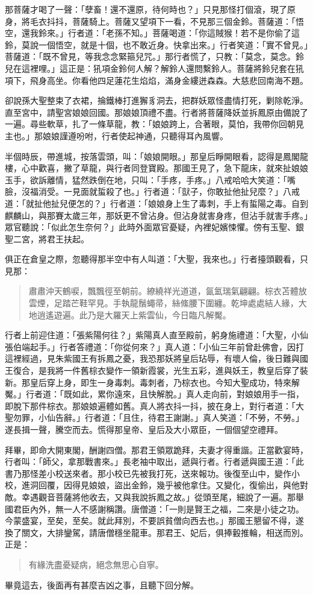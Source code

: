 那菩薩才喝了一聲：「孽畜！還不還原，待何時也？」只見那怪打個滾，現了原身，將毛衣抖抖，菩薩騎上。菩薩又望項下一看，不見那三個金鈴。菩薩道：「悟空，還我鈴來。」行者道：「老孫不知。」菩薩喝道：「你這賊猴！若不是你偷了這鈴，莫說一個悟空，就是十個，也不敢近身。快拿出來。」行者笑道：「實不曾見。」菩薩道：「既不曾見，等我念念緊箍兒咒。」那行者慌了，只教：「莫念，莫念。鈴兒在這裡哩。」這正是：犼項金鈴何人解？解鈴人還問繫鈴人。菩薩將鈴兒套在犼項下，飛身高坐。你看他四足蓮花生焰焰，滿身金縷迸森森。大慈悲回南海不題。

卻說孫大聖整束了衣裙，掄鐵棒打進獬豸洞去，把群妖眾怪盡情打死，剿除乾淨。直至宮中，請聖宮娘娘回國。那娘娘頂禮不盡。行者將菩薩降妖並拆鳳原由備說了一遍。尋些軟草，扎了一條草龍，教：「娘娘跨上，合著眼，莫怕，我帶你回朝見主也。」那娘娘謹遵吩咐，行者使起神通，只聽得耳內風響。

半個時辰，帶進城，按落雲頭，叫：「娘娘開眼。」那皇后睜開眼看，認得是鳳閣龍樓，心中歡喜，撇了草龍，與行者同登寶殿。那國王見了，急下龍床，就來扯娘娘玉手，欲訴離情，猛然跌倒在地，只叫：「手疼，手疼。」八戒哈哈大笑道：「嘴臉，沒福消受。一見面就蜇殺了也。」行者道：「獃子，你敢扯他扯兒麼？」八戒道：「就扯他扯兒便怎的？」行者道：「娘娘身上生了毒刺，手上有蜇陽之毒。自到麒麟山，與那賽太歲三年，那妖更不曾沾身。但沾身就害身疼，但沾手就害手疼。」眾官聽說：「似此怎生奈何？」此時外面眾官憂疑，內裡妃嬪悚懼。傍有玉聖、銀聖二宮，將君王扶起。

俱正在倉皇之際，忽聽得那半空中有人叫道：「大聖，我來也。」行者擡頭觀看，只見那：
\begin{quote}
肅肅沖天鶴唳，飄飄徑至朝前。繚繞祥光道道，氤氳瑞氣翩翩。棕衣苫體放雲煙，足踏芒鞋罕見。手執龍鬚蠅帚，絲絛腰下圍纏。乾坤處處結人緣，大地逍遙遊遍。此乃是大羅天上紫雲仙，今日臨凡解魘。
\end{quote}

行者上前迎住道：「張紫陽何往？」紫陽真人直至殿前，躬身施禮道：「大聖，小仙張伯端起手。」行者答禮道：「你從何來？」真人道：「小仙三年前曾赴佛會，因打這裡經過，見朱紫國王有拆鳳之憂，我恐那妖將皇后玷辱，有壞人倫，後日難與國王復合，是我將一件舊棕衣變作一領新霞裳，光生五彩，進與妖王，教皇后穿了裝新。那皇后穿上身，即生一身毒刺。毒刺者，乃棕衣也。今知大聖成功，特來解魘。」行者道：「既如此，累你遠來，且快解脫。」真人走向前，對娘娘用手一指，即脫下那件棕衣。那娘娘遍體如舊。真人將衣抖一抖，披在身上，對行者道：「大聖勿罪，小仙告辭。」行者道：「且住，待君王謝謝。」真人笑道：「不勞，不勞。」遂長揖一聲，騰空而去。慌得那皇帝、皇后及大小眾臣，一個個望空禮拜。

拜畢，即命大開東閣，酬謝四僧。那君王領眾跪拜，夫妻才得重諧。正當歡宴時，行者叫：「師父，拿那戰書來。」長老袖中取出，遞與行者。行者遞與國王道：「此書乃那怪差小校送來者。那小校已先被我打死，送來報功。後復至山中，變作小校，進洞回覆，因得見娘娘，盜出金鈴，幾乎被他拿住。又變化，復偷出，與他對敵。幸遇觀音菩薩將他收去，又與我說拆鳳之故。」從頭至尾，細說了一遍。那舉國君臣內外，無一人不感謝稱讚。唐僧道：「一則是賢王之福，二來是小徒之功。今蒙盛宴，至矣，至矣。就此拜別，不要誤貧僧向西去也。」那國王懇留不得，遂換了關文，大排鑾駕，請唐僧穩坐龍車。那君王、妃后，俱捧轂推輪，相送而別。正是：
\begin{quote}
有緣洗盡憂疑病，絕念無思心自寧。
\end{quote}

畢竟這去，後面再有甚麼吉凶之事，且聽下回分解。
